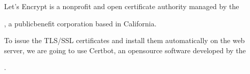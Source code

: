 \documentclass[a4paper,10pt,english,openany,oneside]{sphinxmanual}
\begin{document}
\sphinxAtStartPar
Let’s Encrypt is a non\sphinxhyphen{}profit and open certificate authority managed by the %
\begin{footnote}[11]\sphinxAtStartFootnote
{}
%
\end{footnote}, a public\sphinxhyphen{}benefit corporation based in California.

\sphinxAtStartPar
To issue the TLS/SSL certificates and install them automatically on the web server, we are going to use Certbot, an open\sphinxhyphen{}source software developed by the %
\begin{footnote}[12]\sphinxAtStartFootnote
{}
%
\end{footnote}.
\end{document}
